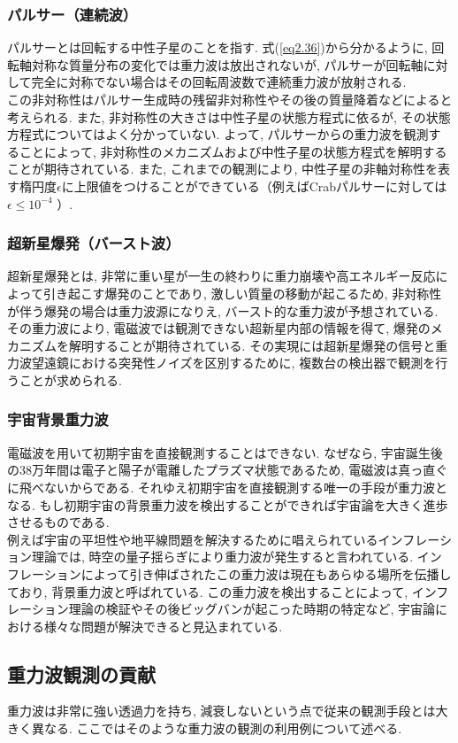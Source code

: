 \subsubsection{パルサー（連続波）}
\vskip3mm
パルサーとは回転する中性子星のことを指す. 式(\ref{eq2.36})から分かるように, 回転軸対称な質量分布の変化では重力波は放出されないが, パルサーが回転軸に対して完全に対称でない場合はその回転周波数で連続重力波が放射される. \\
\quad この非対称性はパルサー生成時の残留非対称性やその後の質量降着などによると考えられる. また, 非対称性の大きさは中性子星の状態方程式に依るが, その状態方程式についてはよく分かっていない. よって, パルサーからの重力波を観測することによって, 非対称性のメカニズムおよび中性子星の状態方程式を解明することが期待されている. また, これまでの観測により, 中性子星の非軸対称性を表す楕円度$\epsilon$に上限値をつけることができている（例えばCrabパルサーに対しては $\epsilon\leq10^{-4}$ ）\cite{20}. 
\subsubsection{超新星爆発（バースト波）}
\vskip3mm
超新星爆発とは, 非常に重い星が一生の終わりに重力崩壊や高エネルギー反応によって引き起こす爆発のことであり, 激しい質量の移動が起こるため, 非対称性が伴う爆発の場合は重力波源になりえ, バースト的な重力波が予想されている\cite{21}. その重力波により, 電磁波では観測できない超新星内部の情報を得て, 爆発のメカニズムを解明することが期待されている. その実現には超新星爆発の信号と重力波望遠鏡における突発性ノイズを区別するために, 複数台の検出器で観測を行うことが求められる. 
\subsubsection{宇宙背景重力波}
\vskip3mm
電磁波を用いて初期宇宙を直接観測することはできない. なぜなら, 宇宙誕生後の38万年間は電子と陽子が電離したプラズマ状態であるため, 電磁波は真っ直ぐに飛べないからである. それゆえ初期宇宙を直接観測する唯一の手段が重力波となる. もし初期宇宙の背景重力波を検出することができれば宇宙論を大きく進歩させるものである. \\
\quad 例えば宇宙の平坦性や地平線問題を解決するために唱えられているインフレーション理論では, 時空の量子揺らぎにより重力波が発生すると言われている. インフレーションによって引き伸ばされたこの重力波は現在もあらゆる場所を伝播しており, 背景重力波と呼ばれている. この重力波を検出することによって, インフレーション理論の検証やその後ビッグバンが起こった時期の特定など, 宇宙論における様々な問題が解決できると見込まれている. 
\subsection{重力波観測の貢献}
重力波は非常に強い透過力を持ち, 減衰しないという点で従来の観測手段とは大きく異なる. ここではそのような重力波の観測の利用例について述べる. 
